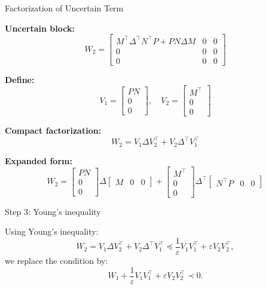 \documentclass{beamer}
\begin{document}
\begin{frame}{Factorization of Uncertain Term}
	\begin{flushleft}
		
		
		
		\textbf{Uncertain block:}
		\[
		W_2 =
		\begin{bmatrix}
			M^\top \Delta^\top N^\top P + PN \Delta M & 0 & 0 \\
			0 & 0 & 0 \\
			0 & 0 & 0
		\end{bmatrix}
		\]
		
		\medskip
		
		\textbf{Define:}
		\[
		V_1 =
		\begin{bmatrix}
			PN \\ 0 \\ 0
		\end{bmatrix},
		\quad
		V_2 =
		\begin{bmatrix}
			M^\top \\ 0 \\ 0
		\end{bmatrix}
		\]
		
		\medskip
		
		\textbf{Compact factorization:}
		\[
		W_2 = V_1 \Delta V_2^\top + V_2 \Delta^\top V_1^\top
		\]
		
		\medskip
		
		\textbf{Expanded form:}
		\[
		W_2 =
		\begin{bmatrix}
			PN \\ 0 \\ 0
		\end{bmatrix}
		\Delta
		\begin{bmatrix}
			M & 0 & 0
		\end{bmatrix}
		+
		\begin{bmatrix}
			M^\top \\ 0 \\ 0
		\end{bmatrix}
		\Delta^\top
		\begin{bmatrix}
			N^\top P & 0 & 0
		\end{bmatrix}
		\]
	
	\end{flushleft}
	
\end{frame}



\begin{frame}{Step 3: Young's inequality}
	\begin{flushleft}

		
		Using Young's inequality:
		\[
		W_2 = V_1 \Delta V_2^\top + V_2 \Delta^\top V_1^\top \preceq \frac{1}{\varepsilon} V_1 V_1^\top + \varepsilon V_2 V_2^\top,
		\]
		we replace the condition by:
		\[
		W_1 + \frac{1}{\varepsilon} V_1 V_1^\top + \varepsilon V_2 V_2^\top \prec 0.
		\]
		
		
	\end{flushleft}
\end{frame}
\end{document}
